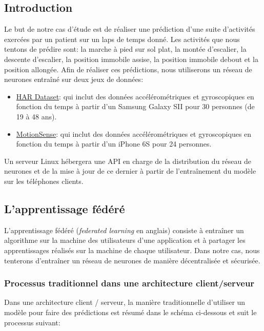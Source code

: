 \documentclass{article}
\begin{document}
\subsection{Introduction}
Le but de notre cas d'étude est de réaliser une prédiction d'une suite d'activités exercées par un patient sur un laps de temps donné. Les activités que nous tentons de prédire sont: la marche à pied sur sol plat, la montée d'escalier, la descente d'escalier, la position immobile assise, la position immobile debout et la position allongée.
Afin de réaliser ces prédictions, nous utiliserons un réseau de neurones entraîné sur deux jeux de données:
\begin{itemize}
    \item \underline{HAR Dataset}: qui inclut des données accélérométriques et gyroscopiques en fonction du temps à partir d'un Samsung Galaxy SII pour 30 personnes (de 19 à 48 ans). \cite{AnguitaPublicDomainDataset2013}
    \item \underline{MotionSense}: qui inclut des données accélérométriques et gyroscopiques en fonction du temps à partir d'un iPhone 6S pour 24 personnes. \cite{MalekzadehMobileSensorData2019} \cite{MalekzadehPrivacyUtilityPreserving2019}
\end{itemize}
Un serveur Linux hébergera une API en charge de la distribution du réseau de neurones et de la mise à jour de ce dernier à partir de l'entraînement du modèle sur les téléphones clients.

\subsection{L'apprentissage fédéré}

L'apprentissage fédéré (\textit{federated learning} en anglais) consiste à entraîner un algorithme sur la machine des utilisateurs d'une application et à partager les apprentissages réalisés sur la machine de chaque utilisateur. Dans notre cas, nous tenterons d'entraîner un réseau de neurones de manière décentralisée et sécurisée.

\subsubsection{Processus traditionnel dans une architecture client/serveur}

Dans une architecture client / serveur, la manière traditionnelle d'utiliser un modèle pour faire des prédictions est résumé dans le schéma ci-dessous et suit le processus suivant:
\end{document}
